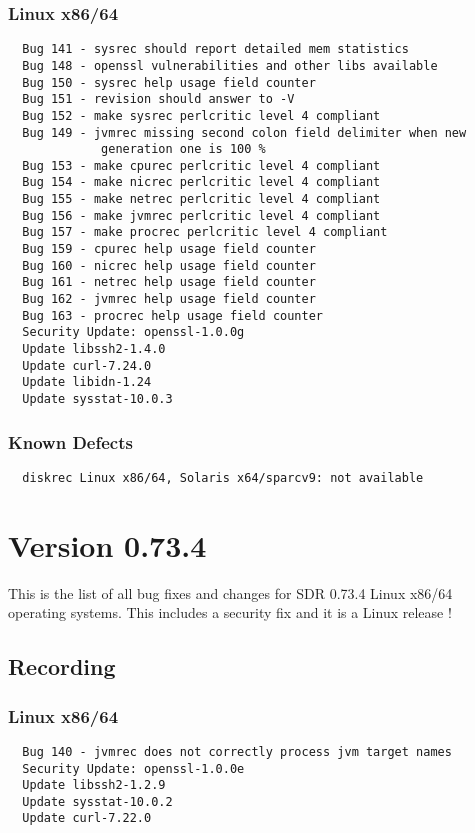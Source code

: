 \subsubsection*{Linux x86/64}
\begin{verbatim}
  Bug 141 - sysrec should report detailed mem statistics
  Bug 148 - openssl vulnerabilities and other libs available
  Bug 150 - sysrec help usage field counter
  Bug 151 - revision should answer to -V
  Bug 152 - make sysrec perlcritic level 4 compliant
  Bug 149 - jvmrec missing second colon field delimiter when new 
             generation one is 100 %
  Bug 153 - make cpurec perlcritic level 4 compliant
  Bug 154 - make nicrec perlcritic level 4 compliant
  Bug 155 - make netrec perlcritic level 4 compliant
  Bug 156 - make jvmrec perlcritic level 4 compliant
  Bug 157 - make procrec perlcritic level 4 compliant
  Bug 159 - cpurec help usage field counter
  Bug 160 - nicrec help usage field counter
  Bug 161 - netrec help usage field counter
  Bug 162 - jvmrec help usage field counter
  Bug 163 - procrec help usage field counter
  Security Update: openssl-1.0.0g
  Update libssh2-1.4.0
  Update curl-7.24.0
  Update libidn-1.24
  Update sysstat-10.0.3
\end{verbatim}

\subsubsection*{Known Defects}
\begin{verbatim}
  diskrec Linux x86/64, Solaris x64/sparcv9: not available
\end{verbatim}


\section{Version 0.73.4}
\noindent
This is the list of all bug fixes and changes for SDR 0.73.4 Linux x86/64
operating systems. This includes a security fix and it is a Linux release !

\subsection*{Recording}

\subsubsection*{Linux x86/64}
\begin{verbatim}
  Bug 140 - jvmrec does not correctly process jvm target names
  Security Update: openssl-1.0.0e 
  Update libssh2-1.2.9
  Update sysstat-10.0.2
  Update curl-7.22.0
\end{verbatim}

